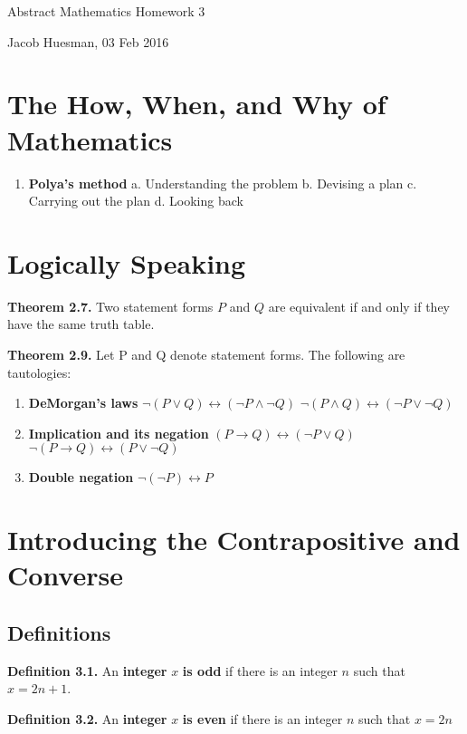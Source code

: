 \documentclass{article}
\begin{document}
\centerline{\sc \large Abstract Mathematics Homework 3}
\vspace{.5pc}
\centerline{\sc Jacob Huesman, 03 Feb 2016}

\vspace{2pc}


\section{The How, When, and Why of Mathematics}
\begin{enumerate}
	\item \textbf{Polya's method}
		\subitem a. Understanding the problem
		\subitem b. Devising a plan
		\subitem c. Carrying out the plan
		\subitem d. Looking back
\end{enumerate} 
	

\section{Logically Speaking}
\textbf{Theorem 2.7.} 
Two statement forms $P$ and $Q$ are equivalent if and only if they have the same truth table.

\textbf{Theorem 2.9.}
Let P and Q denote statement forms. The following are tautologies:
\begin{enumerate}
	\item \textbf{DeMorgan's laws}
	\subitem  $\lnot(P \lor Q) \leftrightarrow (\lnot P \land \lnot Q)$
	\subitem  $\lnot(P \land Q) \leftrightarrow (\lnot P \lor \lnot Q)$
	\item \textbf{Implication and its negation}
	\subitem $(P \rightarrow Q) \leftrightarrow (\lnot P \lor Q)$
	\subitem $\lnot(P \rightarrow Q) \leftrightarrow (P \lor \lnot Q)$
	\item \textbf{Double negation}
	\subitem $\lnot(\lnot P) \leftrightarrow P$
\end{enumerate} 


\section{Introducing the Contrapositive and Converse}
\subsection{Definitions}
\textbf{Definition 3.1.} An \textbf{integer} $x$ \textbf{is odd} if there is an integer $n$ such that $x = 2n +1$.

\textbf{Definition 3.2.} An \textbf{integer} $x$ \textbf{is even} if there is an integer $n$ such that $x = 2n$
\end{document}
